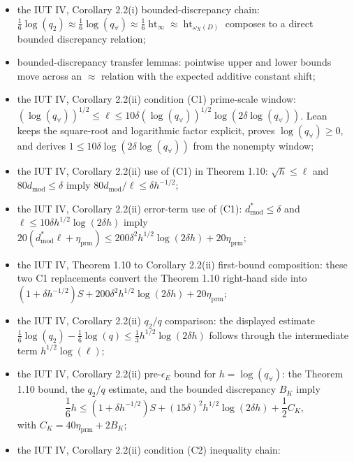 \documentclass[11pt]{article}
\begin{document}
\begin{itemize}
  boundedness below of
  \((1+\epsilon)(\log\operatorname{diff}_X+\log\operatorname{cond}_D)
   -\operatorname{ht}_{\omega_X(D)}\) implies the corresponding pointwise height
  inequality on points of bounded degree;
\item the IUT IV, Corollary 2.2(i) bounded-discrepancy chain:
  \(\frac16\log(q_2)\approx\frac16\log(q_\forall)
   \approx\frac16\operatorname{ht}_\infty
   \approx\operatorname{ht}_{\omega_X(D)}\) composes to a direct bounded
  discrepancy relation;
\item bounded-discrepancy transfer lemmas: pointwise upper and lower bounds move
  across an \(\approx\) relation with the expected additive constant shift;
\item the IUT IV, Corollary 2.2(ii) condition (C1) prime-scale window:
  \((\log(q_\forall))^{1/2}\le\ell\le
   10\delta(\log(q_\forall))^{1/2}\log(2\delta\log(q_\forall))\).  Lean keeps
  the square-root and logarithmic factor explicit, proves
  \(\log(q_\forall)\ge0\), and derives
  \(1\le10\delta\log(2\delta\log(q_\forall))\) from the nonempty window;
\item the IUT IV, Corollary 2.2(ii) use of (C1) in Theorem 1.10:
  \(\sqrt h\le\ell\) and \(80d_{\mathrm{mod}}\le\delta\) imply
  \(80d_{\mathrm{mod}}/\ell\le\delta h^{-1/2}\);
\item the IUT IV, Corollary 2.2(ii) error-term use of (C1):
  \(d^*_{\mathrm{mod}}\le\delta\) and
  \(\ell\le10\delta h^{1/2}\log(2\delta h)\) imply
  \(20(d^*_{\mathrm{mod}}\ell+\eta_{\mathrm{prm}})
   \le200\delta^2h^{1/2}\log(2\delta h)+20\eta_{\mathrm{prm}}\);
\item the IUT IV, Theorem 1.10 to Corollary 2.2(ii) first-bound composition:
  these two C1 replacements convert the Theorem 1.10 right-hand side into
  \((1+\delta h^{-1/2})S+
    200\delta^2h^{1/2}\log(2\delta h)+20\eta_{\mathrm{prm}}\);
\item the IUT IV, Corollary 2.2(ii) \(q_2/q\) comparison:
  the displayed estimate
  \(\frac16\log(q_2)-\frac16\log(q)
   \le\frac13h^{1/2}\log(2\delta h)\) follows through the intermediate
  term \(h^{1/2}\log(\ell)\);
\item the IUT IV, Corollary 2.2(ii) pre-\(\epsilon_E\) bound for
  \(h=\log(q_\forall)\):
  the Theorem 1.10 bound, the \(q_2/q\) estimate, and the bounded discrepancy
  \(B_K\) imply
  \[
    \frac16h\le(1+\delta h^{-1/2})S
    +(15\delta)^2h^{1/2}\log(2\delta h)+\frac12 C_K,
  \]
  with \(C_K=40\eta_{\mathrm{prm}}+2B_K\);
\item the IUT IV, Corollary 2.2(ii) condition (C2) inequality chain:

\end{itemize}
\end{document}
